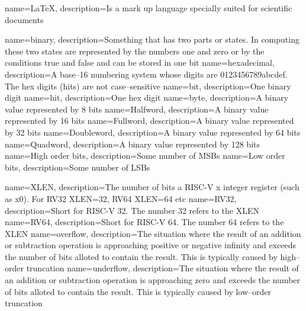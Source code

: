 {
    name=LaTeX,
    description={Is a mark up language specially suited
    for scientific documents}
}

{
	name=binary,
	description={Something that has two parts or states.  In computing
		these two states are represented by the numbers one and zero or
		by the conditions true and false and can be stored in one bit}
}
{
	name=hexadecimal,
	description={A base--16 numbering system whose digits are 
		0123456789abcdef.  The hex digits (hits) are not case--sensitive}
}
{
	name=bit,
	description={One binary digit}
}
{
	name={hit},
	description={One hex digit}
}
{
	name=byte,
	description={A binary value represented by 8 bits}
}
{
	name={Halfword},
	description={A binary value represented by 16 bits}
}
{
	name={Fullword},
	description={A binary value represented by 32 bits}
}
{
	name={Doubleword},
	description={A binary value represented by 64 bits}
}
{
	name={Quadword},
	description={A binary value represented by 128 bits}
}
{
	name={High order bits},
	description={Some number of MSBs}
}
{
    name={Low order bits},
    description={Some number of LSBs}
}

{
	name=XLEN,
	description={The number of bits a RISC-V x integer register 
		(such as x0).  For RV32 XLEN=32, RV64 XLEN=64 etc}
}
{
	name=RV32,
	description={Short for RISC-V 32.  The number 32 refers to the XLEN}
}
{
	name=RV64,
	description={Short for RISC-V 64.  The number 64 refers to the XLEN}
}
{
	name=overflow,
	description={The situation where the result of an addition or 
		subtraction operation is approaching positive or negative 
		infinity and exceeds the number of bits alloted to contain 
		the result.  This is typically caused by high--order truncation}
}
{
	name=underflow,
	description={The situation where the result of an addition or 
		subtraction operation is approaching zero and exceeds the number 
		of bits alloted to contain the result.  This is typically
        caused by low--order truncation}
}

